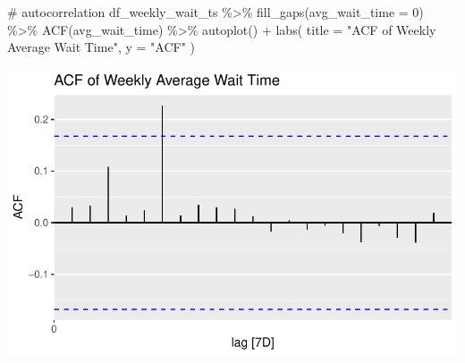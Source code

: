 \documentclass[
  letterpaper,
  DIV=11,
  numbers=noendperiod]{scrartcl}
\newenvironment{Shaded}{\begin{snugshade}}{\end{snugshade}}
\newcommand{\AttributeTok}[1]{\textcolor[rgb]{0.40,0.45,0.13}{#1}}
\newcommand{\CommentTok}[1]{\textcolor[rgb]{0.37,0.37,0.37}{#1}}
\newcommand{\DecValTok}[1]{\textcolor[rgb]{0.68,0.00,0.00}{#1}}
\newcommand{\FunctionTok}[1]{\textcolor[rgb]{0.28,0.35,0.67}{#1}}
\newcommand{\NormalTok}[1]{\textcolor[rgb]{0.00,0.23,0.31}{#1}}
\newcommand{\SpecialCharTok}[1]{\textcolor[rgb]{0.37,0.37,0.37}{#1}}
\newcommand{\StringTok}[1]{\textcolor[rgb]{0.13,0.47,0.30}{#1}}
\begin{document}
\begin{Shaded}
\begin{Highlighting}[]
\CommentTok{\# autocorrelation}
\NormalTok{df\_weekly\_wait\_ts }\SpecialCharTok{\%\textgreater{}\%}
  \FunctionTok{fill\_gaps}\NormalTok{(}\AttributeTok{avg\_wait\_time =} \DecValTok{0}\NormalTok{) }\SpecialCharTok{\%\textgreater{}\%}
  \FunctionTok{ACF}\NormalTok{(avg\_wait\_time) }\SpecialCharTok{\%\textgreater{}\%}
  \FunctionTok{autoplot}\NormalTok{() }\SpecialCharTok{+} 
  \FunctionTok{labs}\NormalTok{(}
    \AttributeTok{title =} \StringTok{"ACF of Weekly Average Wait Time"}\NormalTok{, }
    \AttributeTok{y =} \StringTok{"ACF"}
\NormalTok{  )}
\end{Highlighting}
\end{Shaded}

\includegraphics{final_proj_group1_files/figure-pdf/aggregate_weekly-2.pdf}
\end{document}
